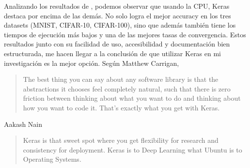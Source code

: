 Analizando los resultados de \citep{mahmoud2019dlbench}, podemos observar que usando la CPU, Keras destaca por encima de las demás. No solo logra el mejor accuracy en los tres datasets (MNIST, CIFAR-10, CIFAR-100), sino que además también tiene los tiempos de ejecución más bajos y una de las mejores tasas de convergencia. Estos resultados junto con su facilidad de uso, accesibilidad y documentación bien estructurada, me hacen llegar a la conclusión de que utilizar Keras en mi investigación es la mejor opción. Según Matthew Carrigan, \begin{quote}The best thing you can say about any software library is that the abstractions it chooses feel completely natural, such that there is zero friction between thinking about what you want to do and thinking about how you want to code it. That's exactly what you get with Keras.\end{quote}
Aakash Nain \begin{quote} Keras is that sweet spot where you get flexibility for research and consistency for deployment. Keras is to Deep Learning what Ubuntu is to Operating Systems. \end{quote}



